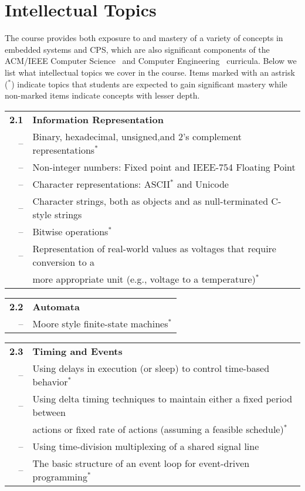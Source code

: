 \section{Intellectual Topics}
\label{sec:topics}

The course provides both exposure to and mastery of a variety of concepts
in embedded systems and CPS, which are also significant components
of the ACM/IEEE
Computer Science~\cite{cs13} and Computer Engineering~\cite{ce16} curricula.
Below we list what intellectual topics we cover in the course.
Items marked with an astrisk ($^*$)
indicate topics that students are expected to gain significant mastery
while non-marked items indicate concepts with lesser depth.

\vspace{0.1in}
\noindent
\begin{tabular}{r l}
{\bf 2.1} & {\bf Information Representation} \\
-- & Binary, hexadecimal, unsigned,and 2's complement representations$^*$ \\
-- & Non-integer numbers: Fixed point and IEEE-754 Floating Point \\
-- & Character representations: ASCII$^*$ and Unicode \\
-- & Character strings, both as objects and as null-terminated C-style strings \\
-- &  Bitwise operations$^*$ \\
-- & Representation of real-world values as voltages that require conversion to a\\
\  & more appropriate unit (e.g., voltage to a temperature)$^*$
\end{tabular}

\vspace{0.1in}
\noindent
\begin{tabular}{r l}
{\bf 2.2} & {\bf Automata}\\
-- & Moore style finite-state machines$^*$
\end{tabular}

\vspace{0.1in}
\noindent
\begin{tabular}{r l}
{\bf 2.3} & {\bf Timing and Events} \\
-- & Using delays in execution (or sleep) to control time-based behavior$^*$ \\
-- & Using delta timing techniques to maintain either a fixed period between \\
\  & actions or fixed rate of actions (assuming a feasible schedule)$^*$ \\
-- & Using time-division multiplexing of a shared signal line \\
-- & The basic structure of an event loop for event-driven programming$^*$
\end{tabular}

